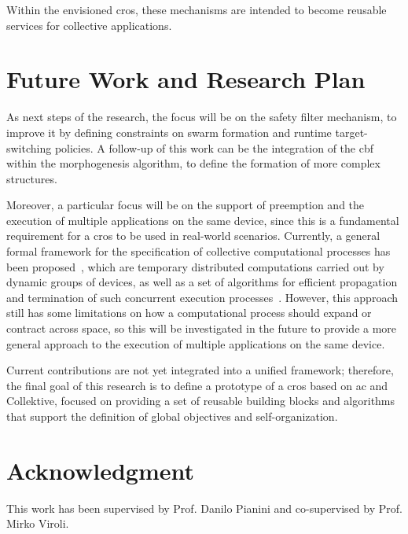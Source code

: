 \documentclass[conference]{IEEEtran}
\begin{document}
Within the envisioned \ac{cros},
these mechanisms are intended to become reusable services for collective applications.

\section{Future Work and Research Plan}\label{sec:future-work-and-research-plan}

As next steps of the research,
the focus will be on the safety filter mechanism,
to improve it by defining constraints on swarm formation and runtime target-switching policies.
%
A follow-up of this work can be the integration of the \ac{cbf} within the morphogenesis algorithm,
to define the formation of more complex structures.

Moreover,
a particular focus will be on the support of preemption and the execution of multiple applications on the same device,
since this is a fundamental requirement for a \ac{cros} to be used in real-world scenarios.
%
Currently,
a general formal framework for the specification of collective computational processes has been proposed~\cite{EAAI2020-processes},
which are temporary distributed computations carried out by dynamic groups of devices,
as well as a set of algorithms for efficient propagation and termination of such concurrent execution processes~\cite{DBLP:journals/fgcs/AudritoCT24}.
%
However,
this approach still has some limitations on how a computational process should expand or contract across space,
so this will be investigated in the future to provide a more general approach to the execution of multiple applications on the same device.

Current contributions are not yet integrated into a unified framework;
therefore,
the final goal of this research is to define a prototype of a \ac{cros} based on \ac{ac} and Collektive,
focused on providing a set of reusable building blocks and algorithms that support the definition of global objectives and self-organization.

\section*{Acknowledgment}
This work has been supervised by Prof. Danilo Pianini and co-supervised by Prof. Mirko Viroli.




\vspace{12pt}
\end{document}
